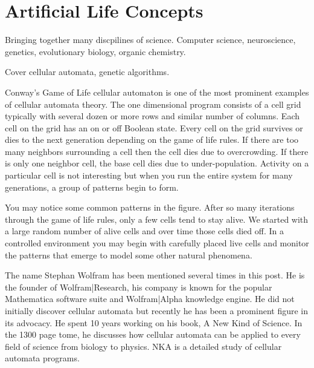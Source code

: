 
\section{Artificial Life Concepts}

Bringing together many
discpilines of science.  Computer science, neuroscience, genetics, evolutionary biology, organic chemistry.

Cover cellular automata, genetic algorithms.

Conway's Game of Life cellular automaton is one of the most prominent examples
of cellular automata theory. The one dimensional program consists of a cell grid
typically with several dozen or more rows and similar number of columns. Each
cell on the grid has an on or off Boolean state. Every cell on the grid survives
or dies to the next generation depending on the game of life rules. If there are
too many neighbors surrounding a cell then the cell dies due to overcrowding. If
there is only one neighbor cell, the base cell dies due to under-population.
Activity on a particular cell is not interesting but when you run the entire
system for many generations, a group of patterns begin to form.

You may notice some common patterns in the figure. After so many iterations
through the game of life rules, only a few cells tend to stay alive. We started
with a large random number of alive cells and over time those cells died off. In
a controlled environment you may begin with carefully placed live cells and
monitor the patterns that emerge to model some other natural phenomena.

The name Stephan Wolfram has been mentioned several times in this post. He is
the founder of Wolfram|Research, his company is known for the popular
Mathematica software suite and Wolfram|Alpha knowledge engine. He did not
initially discover cellular automata but recently he has been a prominent figure
in its advocacy. He spent 10 years working on his book, A New Kind of Science.
In the 1300 page tome, he discusses how cellular automata can be applied to
every field of science from biology to physics. NKA is a detailed study of
cellular automata programs.

